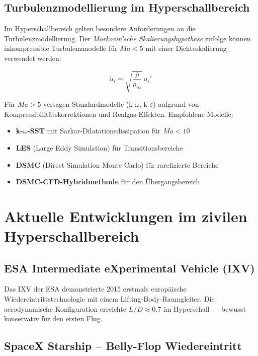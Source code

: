 ﻿\documentclass[12pt,a4paper]{article}
\newcommand{\Ma}{M\!a}
\begin{document}
\subsection{Turbulenzmodellierung im Hyperschallbereich}

Im Hyperschallbereich gelten besondere Anforderungen an die Turbulenzmodellierung.
Der \emph{Morkovin'sche Skalierungshypothese} zufolge können inkompressible
Turbulenzmodelle für $\Ma < 5$ mit einer Dichteskalierung verwendet werden:

\[
  \tilde{u}_i = \sqrt{\frac{\bar{\rho}}{\rho_\infty}}\, u_i'
\]

Für $\Ma > 5$ versagen Standardmodelle (k-$\omega$, k-$\varepsilon$) aufgrund
von Kompressibilitätskorrektionen und Realgas-Effekten. Empfohlene Modelle:

\begin{itemize}[leftmargin=*]
  \item \textbf{k-$\omega$-SST} mit Sarkar-Dilatationsdissipation für $\Ma < 10$
  \item \textbf{LES} (Large Eddy Simulation) für Transitionsbereiche
  \item \textbf{DSMC} (Direct Simulation Monte Carlo) für rarefizierte Bereiche
  \item \textbf{DSMC-CFD-Hybridmethode} für den Übergangsbereich
\end{itemize}

\section{Aktuelle Entwicklungen im zivilen Hyperschallbereich}

\subsection{ESA Intermediate eXperimental Vehicle (IXV)}

Das IXV der ESA demonstrierte 2015 erstmals europäische Wiedereintrittstechnologie
mit einem Lifting-Body-Raumgleiter. Die aerodynamische Konfiguration erreichte
$L/D \approx 0.7$ im Hyperschall --- bewusst konservativ für den ersten Flug.

\subsection{SpaceX Starship -- Belly-Flop Wiedereintritt}
\end{document}
